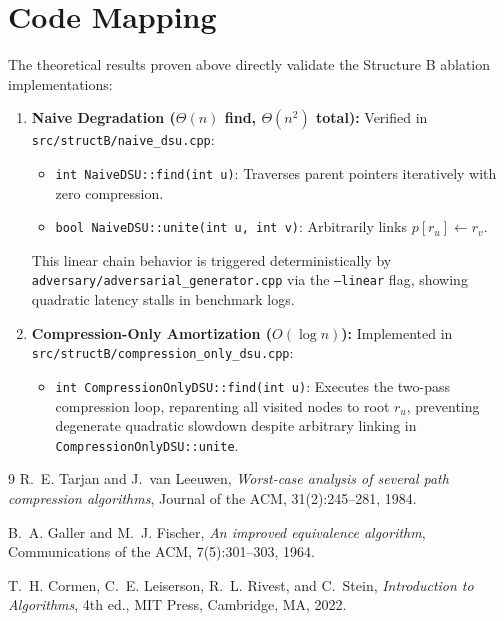 \documentclass[11pt,a4paper]{article}
\begin{document}
\section{Code Mapping}
The theoretical results proven above directly validate the Structure B ablation implementations:
\begin{enumerate}
    \item \textbf{Naive Degradation ($\Theta(n)$ find, $\Theta(n^2)$ total):} Verified in \texttt{src/structB/naive\_dsu.cpp}:
    \begin{itemize}
        \item \texttt{int NaiveDSU::find(int u)}: Traverses parent pointers iteratively with zero compression.
        \item \texttt{bool NaiveDSU::unite(int u, int v)}: Arbitrarily links $p[r_u] \leftarrow r_v$.
    \end{itemize}
    This linear chain behavior is triggered deterministically by \texttt{adversary/adversarial\_generator.cpp} via the \texttt{--linear} flag, showing quadratic latency stalls in benchmark logs.
    \item \textbf{Compression-Only Amortization ($O(\log n)$):} Implemented in \texttt{src/structB/compression\_only\_dsu.cpp}:
    \begin{itemize}
        \item \texttt{int CompressionOnlyDSU::find(int u)}: Executes the two-pass compression loop, reparenting all visited nodes to root $r_u$, preventing degenerate quadratic slowdown despite arbitrary linking in \texttt{CompressionOnlyDSU::unite}.
    \end{itemize}
\end{enumerate}

\begin{thebibliography}{9}
R.~E. Tarjan and J.~van Leeuwen, 
\emph{Worst-case analysis of several path compression algorithms}, 
Journal of the ACM, 31(2):245--281, 1984.

B.~A. Galler and M.~J. Fischer, 
\emph{An improved equivalence algorithm}, 
Communications of the ACM, 7(5):301--303, 1964.

T.~H. Cormen, C.~E. Leiserson, R.~L. Rivest, and C.~Stein, 
\emph{Introduction to Algorithms}, 4th ed., 
MIT Press, Cambridge, MA, 2022.
\end{thebibliography}
\end{document}
